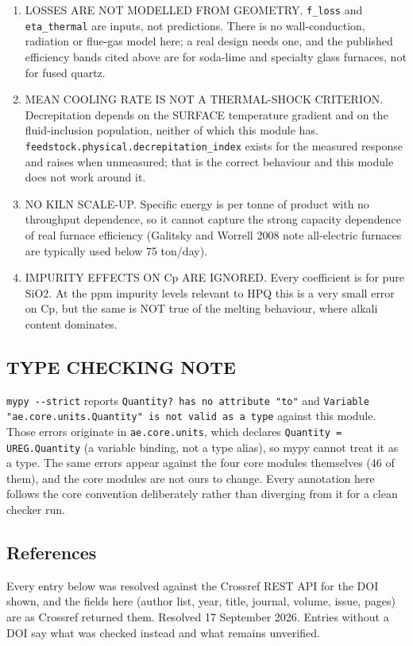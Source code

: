 \documentclass[10pt,a4paper,twoside]{report}
\begin{document}
\begin{enumerate}[leftmargin=*,label=\arabic*.]
\item LOSSES ARE NOT MODELLED FROM GEOMETRY. \texttt{f\_loss} and \texttt{eta\_thermal} are inputs, not predictions. There is no wall-conduction, radiation or flue-gas model here; a real design needs one, and the published efficiency bands cited above are for soda-lime and specialty glass furnaces, not for fused quartz.
\item MEAN COOLING RATE IS NOT A THERMAL-SHOCK CRITERION. Decrepitation depends on the SURFACE temperature gradient and on the fluid-inclusion population, neither of which this module has. \texttt{feedstock.physical.decrepitation\_index} exists for the measured response and raises when unmeasured; that is the correct behaviour and this module does not work around it.
\item NO KILN SCALE-UP. Specific energy is per tonne of product with no throughput dependence, so it cannot capture the strong capacity dependence of real furnace efficiency (Galitsky and Worrell 2008 note all-electric furnaces are typically used below 75 ton/day).
\item IMPURITY EFFECTS ON Cp ARE IGNORED. Every coefficient is for pure SiO2. At the ppm impurity levels relevant to HPQ this is a very small error on Cp, but the same is NOT true of the melting behaviour, where alkali content dominates.
\end{enumerate}

\subsection*{TYPE CHECKING NOTE}

\texttt{mypy -{}-strict} reports \texttt{Quantity? has no attribute "to"} and \texttt{Variable "ae.core.units.Quantity" is not valid as a type} against this module. Those errors originate in \texttt{ae.core.units}, which declares \texttt{Quantity = UREG.Quantity} (a variable binding, not a type alias), so mypy cannot treat it as a type. The same errors appear against the four core modules themselves (46 of them), and the core modules are not ours to change. Every annotation here follows the core convention deliberately rather than diverging from it for a clean checker run.

\subsection*{References}

Every entry below was resolved against the Crossref REST API for the DOI shown, and the fields here (author list, year, title, journal, volume, issue, pages) are as Crossref returned them. Resolved 17 September 2026. Entries without a DOI say what was checked instead and what remains unverified.
\end{document}
